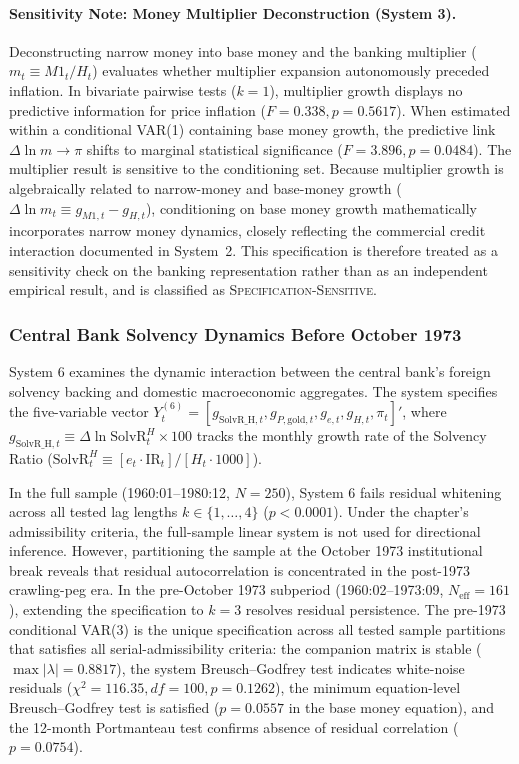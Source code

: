 \paragraph{Sensitivity Note: Money Multiplier Deconstruction (System 3).}
Deconstructing narrow money into base money and the banking multiplier ($m_t \equiv M1_t / H_t$) evaluates whether multiplier expansion autonomously preceded inflation. In bivariate pairwise tests ($k=1$), multiplier growth displays no predictive information for price inflation ($F = 0.338, p = 0.5617$). When estimated within a conditional VAR(1) containing base money growth, the predictive link $\Delta \ln m \to \pi$ shifts to marginal statistical significance ($F = 3.896, p = 0.0484$). The multiplier result is sensitive to the conditioning set. Because multiplier growth is algebraically related to narrow-money and base-money growth ($\Delta \ln m_t \equiv g_{M1,t} - g_{H,t}$), conditioning on base money growth mathematically incorporates narrow money dynamics, closely reflecting the commercial credit interaction documented in System~2. This specification is therefore treated as a sensitivity check on the banking representation rather than as an independent empirical result, and is classified as \textsc{Specification-Sensitive}.

\subsubsection{Central Bank Solvency Dynamics Before October 1973}
\label{sec:granger_solvency_pre73}

System 6 examines the dynamic interaction between the central bank's foreign solvency backing and domestic macroeconomic aggregates. The system specifies the five-variable vector $Y^{(6)}_t = [g_{\text{SolvR\_H},t}, g_{P,\text{gold},t}, g_{e,t}, g_{H,t}, \pi_t]'$, where $g_{\text{SolvR\_H},t} \equiv \Delta \ln \text{SolvR}^H_t \times 100$ tracks the monthly growth rate of the Solvency Ratio ($\text{SolvR}^H_t \equiv [e_t \cdot \text{IR}_t] / [H_t \cdot 1000]$).

In the full sample (1960:01--1980:12, $N=250$), System 6 fails residual whitening across all tested lag lengths $k \in \{1, \dots, 4\}$ ($p < 0.0001$). Under the chapter's admissibility criteria, the full-sample linear system is not used for directional inference. However, partitioning the sample at the October 1973 institutional break reveals that residual autocorrelation is concentrated in the post-1973 crawling-peg era. In the pre-October 1973 subperiod (1960:02--1973:09, $N_{\text{eff}} = 161$), extending the specification to $k=3$ resolves residual persistence. The pre-1973 conditional VAR(3) is the unique specification across all tested sample partitions that satisfies all serial-admissibility criteria: the companion matrix is stable ($\max |\lambda| = 0.8817$), the system Breusch--Godfrey test indicates white-noise residuals ($\chi^2 = 116.35, df=100, p = 0.1262$), the minimum equation-level Breusch--Godfrey test is satisfied ($p = 0.0557$ in the base money equation), and the 12-month Portmanteau test confirms absence of residual correlation ($p = 0.0754$).

